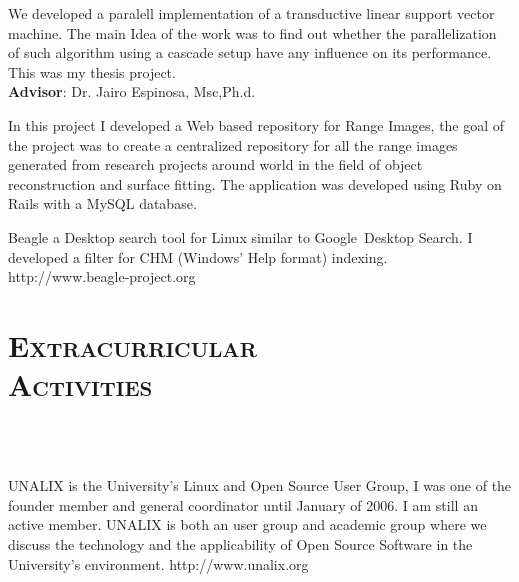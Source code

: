 \begin{resume}
\begin{position}
We developed a paralell implementation of a transductive
linear support vector machine. The main Idea of the work was
to find out whether the parallelization of such algorithm using a cascade
setup have any influence on its performance. This was my thesis project.\\
\textbf{Advisor}:  Dr. Jairo Espinosa, Msc,Ph.d.
\end{position}

\begin{position}
 In this project I developed a Web based repository for Range Images, the goal of the
 project was to create a centralized repository for all the range
 images generated from research projects around world in the field of
 object reconstruction and surface fitting. The application was
 developed using Ruby on Rails with a MySQL database.
\end{position}

\begin{position}
Beagle a Desktop search tool  for Linux similar to
Google\texttrademark  \  Desktop
Search. I developed a filter for CHM (Windows' Help format) indexing.
http://www.beagle-project.org
\end{position}

\section{\textsc{Extracurricular\\ Activities}}

\begin{formatb}
  \\
   
  \body\\
\end{formatb}

\begin{position}
UNALIX is the University's Linux and Open Source User Group, I was one
of the founder member  and general coordinator until January of
2006. I am still an active member. UNALIX is both an user group and academic group where we
discuss the technology and the applicability of Open Source Software
in the University's environment. http://www.unalix.org
\end{position}



\end{resume}
